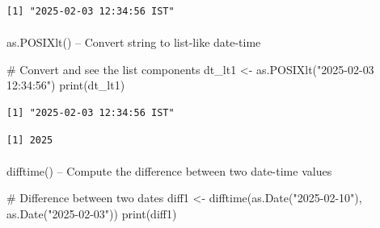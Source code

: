 \documentclass[
  letterpaper,
  DIV=11,
  numbers=noendperiod]{scrartcl}
\makeatletter
\let\oldparagraph\paragraph
\renewcommand{\paragraph}{
    \@ifstar
      \xxxParagraphStar
      \xxxParagraphNoStar
  }
\newcommand{\xxxParagraphStar}[1]{\oldparagraph*{#1}\mbox{}}
\newcommand{\xxxParagraphNoStar}[1]{\oldparagraph{#1}\mbox{}}
\newenvironment{Shaded}{\begin{snugshade}}{\end{snugshade}}
\newcommand{\CommentTok}[1]{\textcolor[rgb]{0.37,0.37,0.37}{#1}}
\newcommand{\DecValTok}[1]{\textcolor[rgb]{0.68,0.00,0.00}{#1}}
\newcommand{\FunctionTok}[1]{\textcolor[rgb]{0.28,0.35,0.67}{#1}}
\newcommand{\NormalTok}[1]{\textcolor[rgb]{0.00,0.23,0.31}{#1}}
\newcommand{\OtherTok}[1]{\textcolor[rgb]{0.00,0.23,0.31}{#1}}
\newcommand{\SpecialCharTok}[1]{\textcolor[rgb]{0.37,0.37,0.37}{#1}}
\newcommand{\StringTok}[1]{\textcolor[rgb]{0.13,0.47,0.30}{#1}}
\makeatother
\begin{document}
\begin{verbatim}
[1] "2025-02-03 12:34:56 IST"
\end{verbatim}

\paragraph{as.POSIXlt() -- Convert string to list-like
date-time}\label{as.posixlt-convert-string-to-list-like-date-time}

\begin{Shaded}
\begin{Highlighting}[]
\CommentTok{\#   Convert and see the list components}
\NormalTok{dt\_lt1 }\OtherTok{\textless{}{-}} \FunctionTok{as.POSIXlt}\NormalTok{(}\StringTok{"2025{-}02{-}03 12:34:56"}\NormalTok{)}
\FunctionTok{print}\NormalTok{(dt\_lt1)}
\end{Highlighting}
\end{Shaded}

\begin{verbatim}
[1] "2025-02-03 12:34:56 IST"
\end{verbatim}

\begin{Shaded}
\end{Shaded}

\begin{verbatim}
[1] 2025
\end{verbatim}

\paragraph{difftime() -- Compute the difference between two date-time
values}\label{difftime-compute-the-difference-between-two-date-time-values}

\begin{Shaded}
\begin{Highlighting}[]
\CommentTok{\#   Difference between two dates}
\NormalTok{diff1 }\OtherTok{\textless{}{-}} \FunctionTok{difftime}\NormalTok{(}\FunctionTok{as.Date}\NormalTok{(}\StringTok{"2025{-}02{-}10"}\NormalTok{), }\FunctionTok{as.Date}\NormalTok{(}\StringTok{"2025{-}02{-}03"}\NormalTok{))}
\FunctionTok{print}\NormalTok{(diff1)}
\end{Highlighting}
\end{Shaded}
\end{document}
